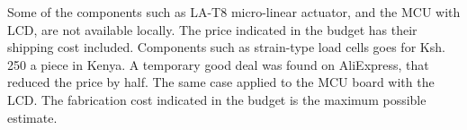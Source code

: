     Some of the components such as LA-T8 micro-linear actuator, and the MCU with LCD,  are not available locally. The price indicated in the budget has their shipping cost included.
    Components such as strain-type load cells goes for Ksh. 250 a piece in Kenya. A temporary good deal was found on AliExpress, that reduced the price by half. The same case applied to the MCU board with the LCD. The fabrication cost indicated in the budget is the maximum possible estimate.


